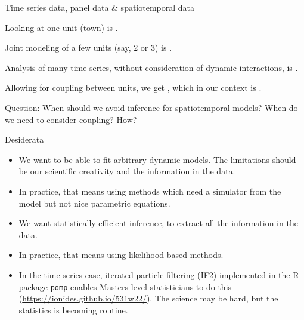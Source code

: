 \documentclass{beamer}
\begin{document}
\begin{frame}{Time series data, panel data \& spatiotemporal data}

  \bi
\item Looking at one unit (town) is .

  \item Joint modeling of a few units (say, 2 or 3) is .

\item Analysis of many time series, without consideration of dynamic interactions, is .

\item Allowing for coupling between units, we get , which in our context is .

  \ei
  
Question: When should we avoid inference for spatiotemporal models? When do we need to consider coupling? How?

\end{frame}

\begin{frame}{Desiderata}

  \begin{itemize}
    \item We want to be able to fit arbitrary dynamic models. The limitations should be our scientific creativity and the information in the data.

    \item In practice, that means using  methods which need a simulator from the model but not nice parametric equations.

    \item We want statistically efficient inference, to extract all the information in the data.

    \item In practice, that means using likelihood-based methods.

      \item  In the time series case, iterated particle filtering (IF2) implemented in the R package \texttt{pomp} enables Masters-level statisticians to do this (\url{https://ionides.github.io/531w22/}). The science may be hard, but the statistics is becoming routine.
      \end{itemize}
  \end{frame}
\end{document}
